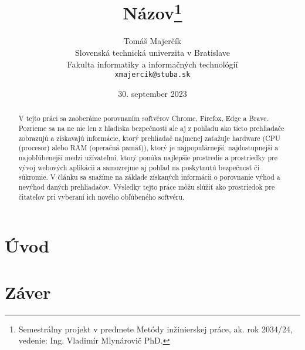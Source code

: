 \documentclass[10pt,twoside,slovak,a4paper]{coursepaper}
\title{Názov\thanks{Semestrálny projekt v predmete Metódy inžinierskej práce, ak. rok 2034/24, vedenie: Ing. Vladimír Mlynárovič PhD.}} %
\author{Tomáš Majerčík\\[2pt]
	{\small Slovenská technická univerzita v Bratislave}\\
	{\small Fakulta informatiky a informačných technológií}\\
	{\small \texttt{xmajercik@stuba.sk}}
	}
\date{\small 30. september 2023} %
\begin{document}
\maketitle

\begin{abstract}

V tejto práci sa zaoberáme porovnaním softvérov Chrome, Firefox, Edge a Brave. Pozrieme sa na ne nie len z hľadiska bezpečnosti ale aj z pohľadu ako tieto prehliadače zobrazujú a získavajú informácie, ktorý prehliadač najmenej zaťažuje hardware (CPU (procesor) alebo RAM (operačná pamäť)), ktorý je najpopulárnejší, najdostupnejší a najobľúbenejší medzi užívateľmi, ktorý ponúka najlepšie prostredie a prostriedky pre vývoj webových aplikácii a samozrejme aj pohľad na poskytnutú bezpečnosť či súkromie. V článku sa snažíme na základe získaných informácii o porovnanie výhod a nevýhod daných prehliadačov. Výsledky tejto práce môžu slúžiť ako prostriedok pre čitateľov pri vyberaní ich nového obľúbeného softvéru.


\end{abstract}



\section{Úvod}









\section{Záver} \label{zaver} %





\end{document}
